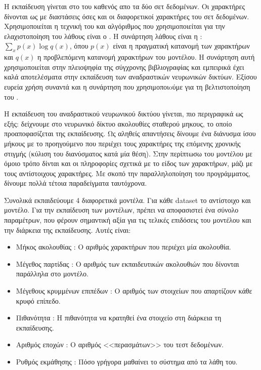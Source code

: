 Η εκπαίδευση γίνεται στο  του καθενός απο τα δύο σετ δεδομένων. 
Οι χαρακτήρες δίνονται ως  με διαστάσεις όσες και οι διαφορετικοί χαρακτήρες του σετ δεδομένων.
Χρησιμοποιείται η τεχνική του  και αλγόριθμος που χρησιμοποιείται για την ελαχιστοποίηση του λάθους είναι ο .
Η συνάρτηση λάθους είναι η : $\sum_x p(x) \log{q(x)}$, όπου $p(x)$ είναι η πραγματική κατανομή των χαρακτήρων και $q(x)$ η προβλεπόμενη κατανομή χαρακτήρων του μοντέλου.
Η συνάρτηση αυτή χρησιμοποιείται στην πλειοψηφία της σύγχρονης βιβλιογραφίας και εμπειρικά έχει καλά αποτελέσματα στην εκπαίδευση των αναδραστικών νευρωνικών δικτύων.
Εξίσου ευρεία χρήση συναντά και η συνάρτηση  που χρησιμοποιoύμε για τη βελτιστοποίηση του .

Η εκπαίδευση του αναδραστικού νευρωνικού δικτύου γίνεται, πιο περιγραφικά ως εξής: δείχνουμε στο νευρωνικό δίκτυο ακολουθίες σταθερού μηκους, το οποίο προαποφασίζεται της εκπαίδευσης.
Ως αληθείς απαντήσεις δίνουμε ένα διάνυσμα ίσου μήκους με το προηγούμενο που περιέχει τους χαρακτήρες της επόμενης χρονικής στιγμής (κύλιση του διανύσματος κατά μία θέση).
Στην περίπτωσω του μοντέλου   με όμοιο τρόπο δίνται και οι πληροφορίες σχετικά με το είδος των χαρακτήρων, μάζι με τους αντίστοιχους χαρακτήρες.
Με σκοπό την παραλληλοποίηση του προγράμματος, δίνουμε πολλά τέτοια παραδείγματα ταυτόχρονα.

Συνολικά εκπαιδεύουμε 4 διαφορετικά μοντέλα. Για κάθε dataset το αντίστοιχο  και  μοντέλο.
Για την εκπαίδευση των μοντέλων, πρέπει να αποφασιστεί ένα σύνολο παραμέτρων, που φέρουν σημαντική αξία για τις τελικές επιδόσεις του μοντέλου και την διάρκεια της εκπαίδευσης. Αυτές είναι:

\begin{itemize} 
\item Μήκος ακολουθίας : Ο αριθμός χαρακτήρων που περιέχει μία ακολουθία.
\item Μέγεθος παρτίδας : Ο αριθμός των εκπαιδευτικών ακολουθιών που δίνονται παράλληλα στο μοντέλο.
\item Μέγεθους κρυμμένων επιπέδων : Ο αριθμός των στοιχείων  που απαρτίζουν κάθε κρυφό επίπεδο.
\item Πιθανότητα : Η πιθανότητα να κρατηθεί ένα στοιχείο στη διάρκεια τη εκπαίδευσης.
\item Αριθμός εποχών : Ο αριθμός <<περασμάτων>> του τεστ δεδομένων.
\item Ρυθμός εκμάθησης : Πόσο γρήγορα μαθαίνει το σύστημα από τα λάθη του.

\end{itemize}

